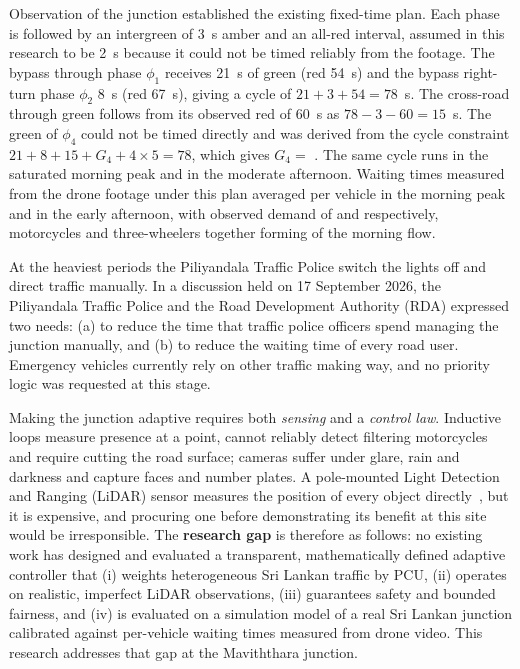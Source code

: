 Observation of the junction established the existing fixed-time plan. Each phase is followed by an intergreen of 3~s amber and an all-red interval, assumed in this research to be 2~s because it could not be timed reliably from the footage. The bypass through phase $\phi_1$ receives 21~s of green (red 54~s) and the bypass right-turn phase $\phi_2$ 8~s (red 67~s), giving a cycle of $21 + 3 + 54 = 78$~s. The cross-road through green follows from its observed red of 60~s as $78 - 3 - 60 = 15$~s. The green of $\phi_4$ could not be timed directly and was derived from the cycle constraint $21 + 8 + 15 + G_4 + 4 \times 5 = 78$, which gives $G_4 = $ . The same cycle runs in the saturated morning peak and in the moderate afternoon. Waiting times measured from the drone footage under this plan averaged  per vehicle in the morning peak and  in the early afternoon, with observed demand of  and  respectively, motorcycles and three-wheelers together forming  of the morning flow.

At the heaviest periods the Piliyandala Traffic Police switch the lights off and direct traffic manually. In a discussion held on 17 September 2026, the Piliyandala Traffic Police and the Road Development Authority (RDA) expressed two needs: (a) to reduce the time that traffic police officers spend managing the junction manually, and (b) to reduce the waiting time of every road user. Emergency vehicles currently rely on other traffic making way, and no priority logic was requested at this stage.

Making the junction adaptive requires both \emph{sensing} and a \emph{control law}. Inductive loops measure presence at a point, cannot reliably detect filtering motorcycles and require cutting the road surface; cameras suffer under glare, rain and darkness and capture faces and number plates. A pole-mounted Light Detection and Ranging (LiDAR) sensor measures the position of every object directly~\cite{zhao2019lidar,lv2019lidar}, but it is expensive, and procuring one before demonstrating its benefit at this site would be irresponsible. The \textbf{research gap} is therefore as follows: no existing work has designed and evaluated a transparent, mathematically defined adaptive controller that (i) weights heterogeneous Sri Lankan traffic by PCU, (ii) operates on realistic, imperfect LiDAR observations, (iii) guarantees safety and bounded fairness, and (iv) is evaluated on a simulation model of a real Sri Lankan junction calibrated against per-vehicle waiting times measured from drone video. This research addresses that gap at the Maviththara junction.

